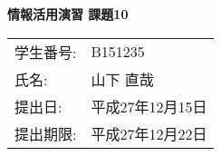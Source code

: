 \topmargin=-1.5cm
\textwidth=17cm
\textheight=25cm
\oddsidemargin=-0.5cm
\evensidemargin=-0.5cm


\begin{center}
  \Large\bf 情報活用演習 課題10
\end{center}

\begin{flushright}
  \begin{tabular}{ll}
    学生番号: & B151235 \\
    氏名:     & 山下 直哉 \\
    提出日:   & 平成27年12月15日 \\
    提出期限: & 平成27年12月22日 \\
  \end{tabular}
\end{flushright}

